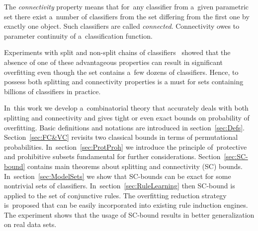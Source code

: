 \documentclass{article}
\let\cite\citep
\renewcommand{\emph}[1]{\textit{#1}}
\begin{document}
The \emph{connectivity} property means that
for~any classifier from a~given parametric set there exist
a~number of classifiers from the set differing from the first one by exactly one object.
Such classifiers are called \emph{connected}.
Connectivity owes to parameter continuity of a~classification function.

Experiments with split and non-split chains of classifiers~\cite{voron09roai2008}
showed that the absence of one of these advantageous properties
can result in significant overfitting
even though the set contains a~few dozens of classifiers.
Hence, to possess both splitting and connectivity properties is a must for sets containing billions of classifiers in practice.

In~this work we develop a~combinatorial theory
that accurately deals with both splitting and connectivity
and gives tight or even exact bounds on probability of overfitting.
Basic definitions and notations are introduced in section~\ref{sec:Defs}.
Section~\ref{sec:FC&VC}
    revisits two classical bounds in terms of permutational probabilities.
In~section~\ref{sec:ProtProh}
    we introduce the principle of~protective and prohibitive subsets
    fundamental for further considerations.
Section~\ref{sec:SC-bound}
    contains main theorems about splitting and connectivity (SC) bounds.
In~section~\ref{sec:ModelSets}
    we show that SC-bounds can be exact for some nontrivial sets of classifiers.
In~section~\ref{sec:RuleLearning}
    then SC-bound is applied to the set of conjunctive rules.
    The overfitting reduction strategy is~proposed
    that can be easily incorporated into existing rule induction engines.
    The experiment shows that the usage of SC-bound results in better generalization on real data sets.

\end{document}
